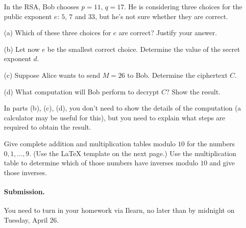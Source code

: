 \documentclass{article}
\begin{document}

\medskip

\begin{problem}
In the RSA, Bob chooses $p =11$, $q = 17$.
He is considering three choices for the public
exponent $e$: $5$, $7$ and $33$,
but he's not sure whether they are correct.

\begin{description}

\item{(a)} Which of these three choices for $e$ are correct?
Justify your answer.

\item{(b)} Let now $e$ be the smallest correct choice.
Determine the value of the secret exponent $d$.

\item{(c)} Suppose Alice wants to send $M = 26$ to
Bob. Determine the ciphertext $C$.

\item{(d)} What computation will Bob perform to
decrypt $C$? Show the result.

\end{description}

In parts (b), (c), (d), you don't need to show the details of the
computation (a calculator may be useful for this),
but you need to explain what steps are required to obtain the result.
\end{problem}


\medskip

\begin{problem}
Give complete addition and multiplication tables modulo $10$
for the numbers $0,1,...,9$. (Use the {\LaTeX} template on the next
page.) Use the multiplication table to determine which of
those numbers have inverses modulo $10$ and give those inverses.
\end{problem}


\vskip 0.1in
\paragraph{Submission.}
You need to turn in your homework via Ilearn, no later than by midnight on
Tuesday, April 26.




\end{document}
